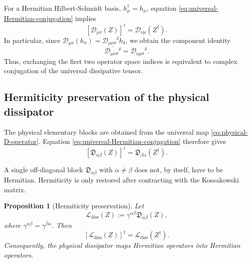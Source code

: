 \documentclass[notitlepage,aip,reprint,onecolumn]{revtex4-1}
\newtheorem{proposition}[theorem]{Proposition}
\theoremstyle{definition}
\begin{document}
For a Hermitian Hilbert-Schmidt basis, \(h_\mu^\dagger=h_\mu\), equation \eqref{eq:universal-Hermitian-conjugation} implies
\begin{equation}\label{eq:elementary-Hermitian-conjugation}
    \left[
    \mathcal D_{\mu\nu}(Z)
    \right]^\dagger
    =
    \mathcal D_{\nu\mu}(Z^\dagger).
\end{equation}
In particular, since \(\mathcal D_{\mu\nu}(h_\sigma) = \mathcal D_{\mu\nu\sigma}{}^\delta h_\delta\), we obtain the component identity
\begin{equation}\label{eq:D-component-conjugation}
    \overline{
    \mathcal D_{\mu\nu\sigma}{}^\delta
    }
    =
    \mathcal D_{\nu\mu\sigma}{}^\delta.
\end{equation}
Thus, exchanging the first two operator space indices is equivalent to complex conjugation of the universal dissipative tensor.

\subsection{Hermiticity preservation of the physical dissipator}

The physical elementary blocks are obtained from the universal map \eqref{eq:physical-D-operator}. Equation \eqref{eq:universal-Hermitian-conjugation} therefore gives
\begin{equation}\label{eq:physical-block-Hermitian-conjugation}
    \left[
    \mathfrak{D}_{\alpha\beta}(Z)
    \right]^\dagger
    =
    \mathfrak{D}_{\beta\alpha}(Z^\dagger).
\end{equation}

A single off-diagonal block \(\mathfrak{D}_{\alpha\beta}\) with \(\alpha \neq \beta\) does not, by itself, have to be Hermitian. Hermiticity is only restored after contracting with the Kossakowski matrix.

\begin{proposition}[Hermiticity preservation]
Let
\[
    \mathcal L_{\mathrm{diss}}(Z)
    :=
    \gamma^{\alpha\beta}
    \mathfrak{D}_{\alpha\beta}(Z),
\]
where \(\gamma^{\alpha\beta} = \overline{\gamma^{\beta\alpha}}\). Then
\begin{equation}\label{eq:full-dissipator-Hermitian-conjugation}
\left[
\mathcal L_{\mathrm{diss}}(Z)
\right]^\dagger
=
\mathcal L_{\mathrm{diss}}(Z^\dagger).
\end{equation}
Consequently, the physical dissipator maps Hermitian operators into Hermitian operators.
\end{proposition}
\end{document}

